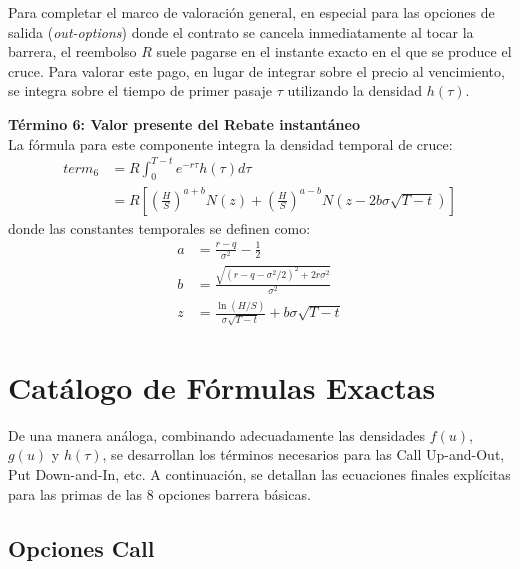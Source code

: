 Para completar el marco de valoración general, en especial para las opciones de salida (\textit{out-options}) donde el contrato se cancela inmediatamente al tocar la barrera, el reembolso $R$ suele pagarse en el instante exacto en el que se produce el cruce. Para valorar este pago, en lugar de integrar sobre el precio al vencimiento, se integra sobre el tiempo de primer pasaje $\tau$ utilizando la densidad $h(\tau)$. 

\textbf{Término 6: Valor presente del Rebate instantáneo}\\
La fórmula para este componente integra la densidad temporal de cruce:
\begin{align}
term_6 &= R \int_{0}^{T-t} e^{-r\tau} h(\tau) d\tau \nonumber \\
       &= R \left[ \left(\frac{H}{S}\right)^{a+b} N(z) + \left(\frac{H}{S}\right)^{a-b} N(z - 2b\sigma\sqrt{T-t}) \right]
\end{align}
donde las constantes temporales se definen como:
\begin{align}
a &= \frac{r-q}{\sigma^2} - \frac{1}{2} \\
b &= \frac{\sqrt{(r-q-\sigma^2/2)^2 + 2r\sigma^2}}{\sigma^2} \\
z &= \frac{\ln(H/S)}{\sigma \sqrt{T-t}} + b\sigma \sqrt{T-t}
\end{align}

\section{Catálogo de Fórmulas Exactas}

De una manera análoga, combinando adecuadamente las densidades $f(u)$, $g(u)$ y $h(\tau)$, se desarrollan los términos necesarios para las Call Up-and-Out, Put Down-and-In, etc. A continuación, se detallan las ecuaciones finales explícitas para las primas de las 8 opciones barrera básicas.

\subsection{Opciones Call}

